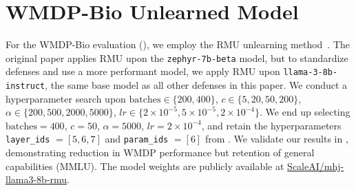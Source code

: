 \section{WMDP-Bio Unlearned Model}\label{app:wmdp-bio-unlearned-model}

For the WMDP-Bio evaluation (), we employ the RMU unlearning method~\citep{li2024wmdp}. The original paper applies RMU upon the \verb|zephyr-7b-beta| model, but to standardize defenses and use a more performant model, we apply RMU upon \verb|llama-3-8b-instruct|, the same base model as all other defenses in this paper. We conduct a hyperparameter search upon $\text{batches} \in \{200, 400\}$, $c \in \{5, 20, 50, 200\}$, $\alpha \in \{200, 500, 2000, 5000\}$, $lr \in \{2 \times 10^{-5}, 5 \times 10^{-5}, 2\times 10^{-4}\}$. We end up selecting $\text{batches} = 400$, $c = 50$, $\alpha = 5000$, $lr = 2 \times 10^{-4}$, and retain the hyperparameters \verb|layer_ids| $ = [5,6,7]$ and \verb|param_ids| $= [6]$ from \citet{li2024wmdp}. We validate our results in , demonstrating reduction in WMDP performance but retention of general capabilities (MMLU). The model weights are publicly available at \href{https://huggingface.co/ScaleAI/mhj-llama3-8b-rmu}{ScaleAI/mhj-llama3-8b-rmu}.

